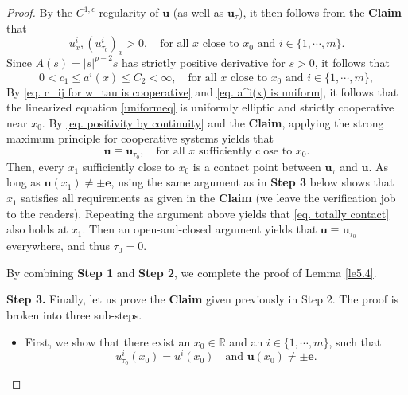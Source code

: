 \documentclass[11pt,twoside,reqno]{amsart}
\numberwithin{equation}{section}
\begin{document}
\begin{proof}
By the $C^{1,\epsilon}$ regularity of $\mathbf{u}$ (as well as $\mathbf{u}_{\tau}$), it then follows from the \textbf{Claim} that
\begin{equation*}
    u^{i}_{x},(u_{\tau_0}^{i})_{x}>0,\quad\mbox{for all }x\mbox{ close to }x_{0}\mbox{ and }i\in\{1,\cdots,m\}.
\end{equation*}
Since $A(s)=|s|^{p-2}s$ has strictly positive derivative for $s>0$, it follows that
\begin{equation}\label{eq. a^i(x) is uniform}
    0<c_{1}\leq a^{i}(x)\leq C_{2}<\infty,\quad\mbox{for all }x\mbox{ close to }x_{0}\mbox{ and }i\in\{1,\cdots,m\},
\end{equation}
By \eqref{eq. c_ij for w_tau is cooperative} and \eqref{eq. a^i(x) is uniform}, it follows that the linearized equation \eqref{uniformeq} is uniformly elliptic and strictly cooperative near $x_{0}$. By \eqref{eq. positivity by continuity} and the \textbf{Claim}, applying the strong maximum principle for cooperative systems yields that
\begin{equation}\label{eq. totally contact}
    \mathbf{u}\equiv\mathbf{u}_{\tau_0},\quad\mbox{for all }x\mbox{ sufficiently close to }x_{0}.
\end{equation}
Then, every $x_{1}$ sufficiently close to $x_{0}$ is a contact point between $\mathbf{u}_{\tau}$ and $\mathbf{u}$. As long as $\mathbf{u}(x_{1})\neq\pm\mathbf{e}$, using the same argument as in \textbf{Step 3} below shows that $x_{1}$ satisfies all requirements as given in the \textbf{Claim} (we leave the verification job to the readers). Repeating the argument above yields that \eqref{eq. totally contact} also holds at $x_{1}$. Then an open-and-closed argument yields that $\mathbf{u}\equiv\mathbf{u}_{\tau_0}$ everywhere, and thus $\tau_{0}=0$.

By combining \textbf{Step 1} and \textbf{Step 2}, we complete the proof of Lemma \ref{le5.4}.

\textbf{Step 3.} Finally, let us prove the \textbf{Claim} given previously in Step 2. The proof is broken into three sub-steps.
\begin{itemize}
    \item First, we show that there exist an $x_{0}\in\mathbb{R}$ and an $i\in\{1,\cdots,m\}$, such that
    \begin{equation*}
        u_{\tau_{0}}^{i}(x_{0})=u^{i}(x_{0})\quad\mbox{and }\mathbf{u}(x_{0})\neq\pm\mathbf{e}.
    \end{equation*}
    

\end{itemize}
\end{proof}
\end{document}
